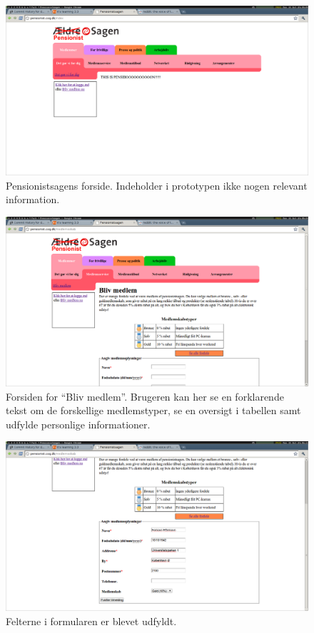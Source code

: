 \begin{figure}[h]
    \centering
    \includegraphics[width=.95\textwidth]{billeder/opgave1_trin1.png}
    \caption{Pensionistsagens forside. Indeholder i prototypen ikke nogen relevant information.}
    \label{fig:opg1_trin1}
\end{figure}
\begin{figure}[h]
    \centering
    \includegraphics[width=.95\textwidth]{billeder/opgave1_trin2.png}
    \caption{Forsiden for ``Bliv medlem''. Brugeren kan her se en forklarende tekst om de forskellige medlemstyper, se en oversigt i tabellen samt udfylde personlige informationer.}
    \label{fig:opg1_trin2}
\end{figure}
\begin{figure}[h]
    \centering
    \includegraphics[width=.95\textwidth]{billeder/opgave1_trin3.png}
    \caption{Felterne i formularen er blevet udfyldt.}
    \label{fig:opg1_trin3}
\end{figure}
